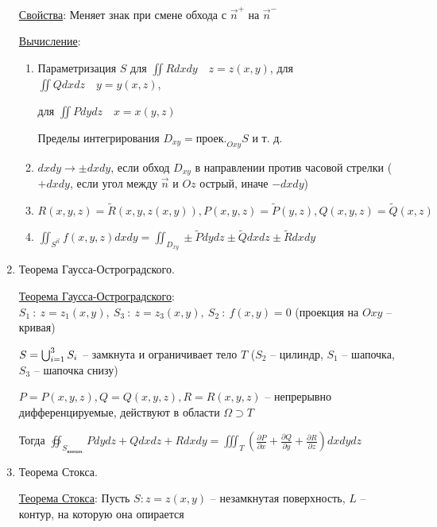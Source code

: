 \documentclass[12pt]{article}
\begin{document}
\begin{enumerate}
        \hyperlink{surfaceintegralofsecondkindproperties}{Свойства}: Меняет знак при смене обхода с $\vec{n}^+$ на $\vec{n}^-$

        \hyperlink{surfaceintegralofsecondkindcalculation}{Вычисление}:

        \begin{enumerate}
            \item Параметризация $S$ \quad для $\iint Rdxdy \quad z = z(x, y)$, для $\iint Qdxdz \quad y = y(x, z)$,

            для $\iint Pdydz \quad x = x(y, z)$

            Пределы интегрирования $D_{xy} = \text{проек.}_{Oxy} S$ и т. д.

            \item $dxdy \to \pm dxdy$, если обход $D_{xy}$ в направлении против часовой стрелки ($+dxdy$, если угол между $\vec{n}$ и $Oz$ острый, иначе $-dxdy$)

            \item $R(x, y, z) = \tilde{R}(x, y, z(x, y)), P(x, y, z) = \tilde{P}(y, z), Q(x, y, z) = \tilde{Q}(x, z)$

            \item $\iint_{S^{\vec{n}}} f(x, y, z) dxdy = \iint_{D_{xy}} \pm \tilde{P}dydz \pm \tilde{Q}dxdz \pm \tilde{R}dxdy$
        \end{enumerate}

        \item Теорема Гаусса-Остроградского.

        \hyperlink{theoremGaussOstrogradskyy}{Теорема Гаусса-Остроградского}:
        $S_1\ : \ z = z_1(x, y),\ S_3\ :\ z = z_3(x, y),\ S_2\ : \ f(x, y) = 0$ (проекция на $Oxy$ -- кривая)

        $S = \bigcup_{i = 1}^3 S_i$ -- замкнута и ограничивает тело $T$ ($S_2$ -- цилиндр, $S_1$ -- шапочка, $S_3$ -- шапочка снизу)

        $P = P(x, y, z), Q = Q(x, y, z), R = R(x, y, z)$ -- непрерывно дифференцируемые, действуют в области $\Omega \supset T$

        Тогда $\oiint_{S_{\text{внешн.}}} Pdydz + Qdxdz + Rdxdy = \iiint_T \left(\frac{\partial P}{\partial x} + \frac{\partial Q}{\partial y} + \frac{\partial R}{\partial z}\right) dxdydz$


        \item Теорема Стокса.

        \hyperlink{theoremStokes}{Теорема Стокса}: Пусть $S : z = z(x, y)$ -- незамкнутая поверхность, $L$ -- контур, на которую она опирается


\end{enumerate}
\end{document}
